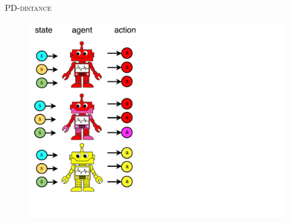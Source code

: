 \documentclass[french]{beamer}
\begin{document}
    \begin{frame}{\textsc{PD-distance}}
        \begin{figure}
            \begin{center}
                \includegraphics[width=1.0\textwidth]{img/pddistance0.pdf}
            \end{center}
        \end{figure}
    \end{frame}
\end{document}
